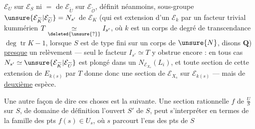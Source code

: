 $\mathcal E_U$ sur $\mathcal E_S$ ni $=$ de $\mathcal E_{\widetilde U}$ sur $\mathcal E_{\widetilde{\mathcal O}}$, définit néanmoins,   sous-groupe $\unsure{\mathcal E_{\widetilde K}|\mathcal E_{\widetilde U}}=N_{s'}$ de $\mathcal E_K$ (qui est extension d'un $\mathcal E_k$ par un facteur trivial kummérien $T\underset{\deleted{\unsure{?}}}{\simeq}I_{s'}$, où $k$ est un corps de degré de transcendance $\deg\operatorname{tr}K-1$, lorsque $S$ est de type fini sur un corps de $\unsure{N}$, disons $\mathbf Q$) \uline{presque} un relèvement --- seul le facteur $I_{s'}\simeq T$ y obstrue encore : en tous cas $N_{s'}\simeq\unsure{\mathcal E_{\widetilde K}|\mathcal E_{\widetilde U}}$ est plongé dans un $N_{\mathcal E_{X_s}}(L_i)$, et toute section de cette extension de $E_{k(s)}$ par $T$ donne donc une section de $\mathcal E_{X_s}$ sur $\mathcal E_{k(s)}$ --- mais de \uline{deuxième} espèce.

Une  autre façon de dire ces choses est la suivante. Une section rationnelle $f$ de $\frac{U}{S}$ sur $S$, de domaine de définition l'ouvert $S'$ de $S$,  peut s'interpréter en termes de la famille des pts $f(s)\in U_s$, où $s$ parcourt l'ens des pts de $S$
